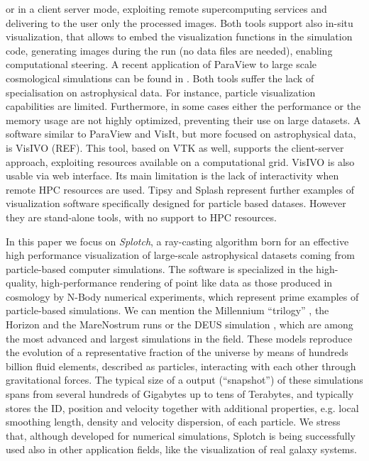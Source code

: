 \documentclass[11pt]{article}
\begin{document}
or in a client server mode, exploiting remote supercomputing services and delivering
to the user only the processed images. Both tools support also in-situ visualization, 
that allows to embed the visualization functions in the simulation code, generating images
during the run (no data files are needed), enabling computational steering. 
A recent application of ParaView 
to large scale cosmological simulations can be found in \cite{2011ApJS..195...11W}. 
Both tools suffer the lack
of specialisation on astrophysical data. For instance, particle visualization 
capabilities are limited. Furthermore, in some cases either the performance or 
the memory usage are not highly optimized, preventing their use on  
large datasets. A software similar to ParaView and VisIt, but more focused on 
astrophysical data, is VisIVO (REF). This tool, based on VTK as well, supports
the client-server approach, exploiting resources available on a computational grid.
VisIVO is also usable via web interface. Its main limitation 
is the lack of interactivity when remote HPC resources are used.
Tipsy \cite{tipsyurl} and Splash \cite{splash} represent
further examples of visualization software specifically designed for 
particle based datases. However they are stand-alone tools, with no support to
HPC resources.

In this paper we focus on {\it Splotch}, a ray-casting
algorithm born for an effective high performance visualization of large-scale 
astrophysical datasets coming from particle-based computer simulations. The software is 
specialized in the high-quality, high-performance rendering of point like data as those 
produced in cosmology by N-Body numerical experiments, which 
represent prime examples of particle-based simulations. We can mention 
the Millennium ``trilogy'' \cite{millennium}, the Horizon and the
MareNostrum runs \cite{horizon} or the DEUS simulation \cite{deus}, which
are among the most advanced and largest simulations in the field. 
These models reproduce the evolution of a representative fraction
of the universe by means of hundreds billion fluid elements, described as particles,
interacting with each other through gravitational
forces. The typical size of a output (``snapshot'') of these simulations spans from several hundreds 
of Gigabytes up to tens of Terabytes, and typically stores the
ID, position and velocity together with additional properties, e.g.
local smoothing length, density and velocity dispersion, of each particle.
We stress that, although developed for numerical simulations, Splotch is being successfully used 
also in other application fields, like the visualization of real galaxy systems.
\end{document}
